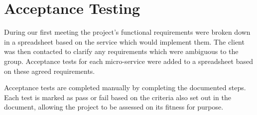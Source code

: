 \section{Acceptance Testing}
\par
During our first meeting the project's functional requirements were broken down in a spreadsheet based on the service which would implement them. The client was then contacted to clarify any requirements which were ambiguous to the group. Acceptance tests for each micro-service were added to a spreadsheet based on these agreed requirements.

\par
Acceptance tests are completed manually by completing the documented steps. Each test is marked as pass or fail based on the criteria also set out in the document, allowing the project to be assessed on its fitness for purpose.